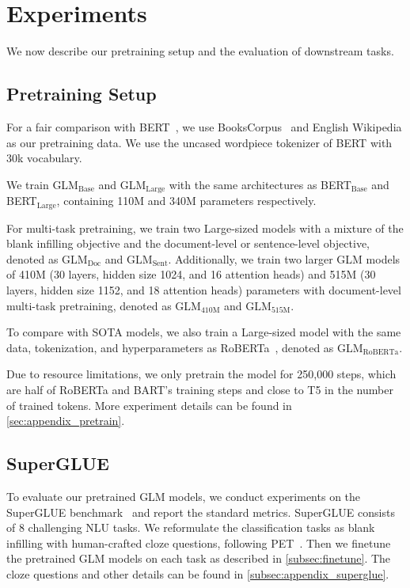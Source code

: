 \section{Experiments}
\label{sec:experiment}

We now describe our pretraining setup and the evaluation of downstream tasks.

\subsection{Pretraining Setup}
\label{subsec:data}
For a fair comparison with BERT~\cite{devlinBERT2019}, we use BooksCorpus~\cite{BookCorpusZhu5} and English Wikipedia as our pretraining data. We use the uncased wordpiece tokenizer of BERT with 30k vocabulary. 

We train GLM$_\text{Base}$ and GLM$_\text{Large}$ with the same architectures as BERT$_\text{Base}$ and BERT$_\text{Large}$, containing 110M and 340M parameters respectively. 

For multi-task pretraining, we train two Large-sized models with a mixture of the blank infilling objective and the document-level or sentence-level objective, denoted as GLM$_\text{Doc}$ and GLM$_\text{Sent}$.  Additionally, we train two larger GLM models of 410M (30 layers, hidden size 1024, and 16 attention heads) and 515M (30 layers, hidden size 1152, and 18 attention heads) parameters with document-level multi-task pretraining, denoted as GLM$_\text{410M}$ and GLM$_\text{515M}$.

To compare with SOTA models, we also train a Large-sized model with the same data, tokenization, and hyperparameters as RoBERTa~\cite{RoBERTa}, denoted as GLM$_{\text{RoBERTa}}$.

Due to resource limitations, we only pretrain the model for 250,000 steps, which are half of RoBERTa and BART's training steps and close to T5 in the number of trained tokens. More experiment details can be found in \ref{sec:appendix_pretrain}.

\subsection{SuperGLUE}
\label{subsec:single_obj}

To evaluate our pretrained GLM models, we conduct experiments on the SuperGLUE benchmark~\cite{SuperGLUE2019} and report the standard metrics. SuperGLUE consists of 8 challenging NLU tasks. We reformulate the classification tasks as blank infilling with human-crafted cloze questions, following PET~\cite{PET2:2009-07118}. Then we finetune the pretrained GLM models on each task as described in \ref{subsec:finetune}. The cloze questions and other details can be found in \ref{subsec:appendix_superglue}.

